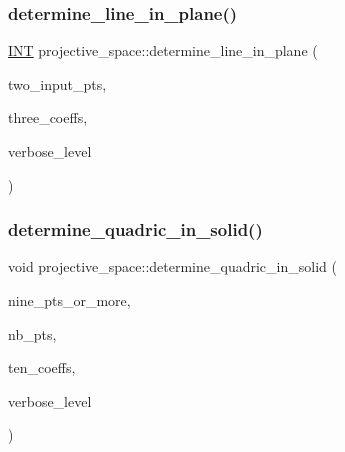 \mbox{\label{classprojective__space_ae7e8e26c331028d5996f7dc4b6a1d7b2}} 
\subsubsection{\texorpdfstring{determine\+\_\+line\+\_\+in\+\_\+plane()}{determine\_line\_in\_plane()}}
{\footnotesize\ttfamily \mbox{\hyperlink{galois_8h_a09fddde158a3a20bd2dcadb609de11dc}{I\+NT}} projective\+\_\+space\+::determine\+\_\+line\+\_\+in\+\_\+plane (\begin{DoxyParamCaption}\item[{\mbox{\hyperlink{galois_8h_a09fddde158a3a20bd2dcadb609de11dc}{I\+NT}} $\ast$}]{two\+\_\+input\+\_\+pts,  }\item[{\mbox{\hyperlink{galois_8h_a09fddde158a3a20bd2dcadb609de11dc}{I\+NT}} $\ast$}]{three\+\_\+coeffs,  }\item[{\mbox{\hyperlink{galois_8h_a09fddde158a3a20bd2dcadb609de11dc}{I\+NT}}}]{verbose\+\_\+level }\end{DoxyParamCaption})}

\mbox{\label{classprojective__space_ae8af1e9ad085a0bfb9233967b3a4a8a0}} 
\subsubsection{\texorpdfstring{determine\+\_\+quadric\+\_\+in\+\_\+solid()}{determine\_quadric\_in\_solid()}}
{\footnotesize\ttfamily void projective\+\_\+space\+::determine\+\_\+quadric\+\_\+in\+\_\+solid (\begin{DoxyParamCaption}\item[{\mbox{\hyperlink{galois_8h_a09fddde158a3a20bd2dcadb609de11dc}{I\+NT}} $\ast$}]{nine\+\_\+pts\+\_\+or\+\_\+more,  }\item[{\mbox{\hyperlink{galois_8h_a09fddde158a3a20bd2dcadb609de11dc}{I\+NT}}}]{nb\+\_\+pts,  }\item[{\mbox{\hyperlink{galois_8h_a09fddde158a3a20bd2dcadb609de11dc}{I\+NT}} $\ast$}]{ten\+\_\+coeffs,  }\item[{\mbox{\hyperlink{galois_8h_a09fddde158a3a20bd2dcadb609de11dc}{I\+NT}}}]{verbose\+\_\+level }\end{DoxyParamCaption})}

